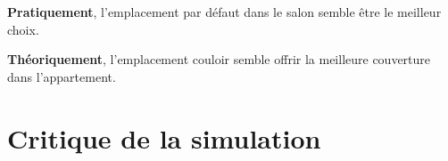 \textbf{Pratiquement}, l'emplacement par défaut dans le salon semble être le meilleur choix.

\textbf{Théoriquement}, l'emplacement couloir semble offrir la meilleure couverture dans l'appartement.\\

\section{Critique de la simulation}
